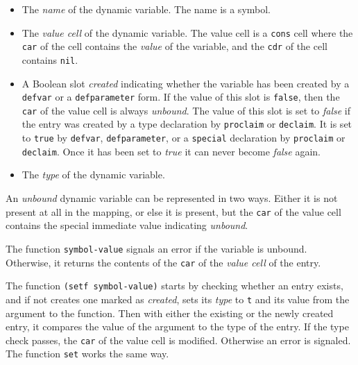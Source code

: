 \begin{itemize}
\item The \emph{name} of the dynamic variable.  The name is a symbol. 
\item The \emph{value cell} of the dynamic variable.  The value cell
  is a \texttt{cons} cell where the \texttt{car} of the cell contains
  the \emph{value} of the variable, and the \texttt{cdr} of the cell
  contains \texttt{nil}. 
\item A Boolean slot \emph{created} indicating whether the variable
  has been created by a \texttt{defvar} or a \texttt{defparameter}
  form.  If the value of this slot is \texttt{false}, then the
  \texttt{car} of the value cell is always \emph{unbound}.  The value
  of this slot is set to \emph{false} if the entry was created by a
  type declaration by \texttt{proclaim} or \texttt{declaim}.  It is
  set to \texttt{true} by \texttt{defvar}, \texttt{defparameter}, or a
  \texttt{special} declaration by \texttt{proclaim} or
  \texttt{declaim}.  Once it has been set to \emph{true} it can never
  become \emph{false} again.
\item The \emph{type} of the dynamic variable.  
\end{itemize}

An \emph{unbound} dynamic variable can be represented in two ways.
Either it is not present at all in the mapping, or else it is present,
but the \texttt{car} of the value cell contains the special immediate
value indicating \emph{unbound}.  

The function \texttt{symbol-value} signals an error if the variable is
unbound.  Otherwise, it returns the contents of the \texttt{car} of
the \emph{value cell} of the entry.

The function \texttt{(setf symbol-value)} starts by checking whether
an entry exists, and if not creates one marked as \emph{created}, sets
its \emph{type} to \texttt{t} and its value from the argument to the
function.  Then with either the existing or the newly created entry,
it compares the value of the argument to the type of the entry.  If
the type check passes, the \texttt{car} of the value cell is
modified.  Otherwise an error is signaled.  The function \texttt{set}
works the same way. 

